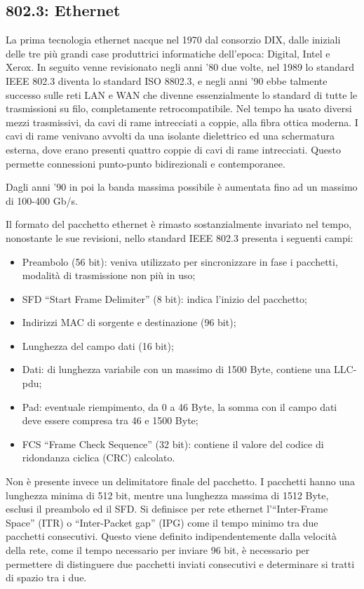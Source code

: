\documentclass{article}
\numberwithin{equation}{subsection}
\begin{document}

\subsection{802.3: Ethernet}
\label{sec:ieee_802.3}

La prima tecnologia ethernet nacque nel 1970 dal consorzio DIX, dalle iniziali delle tre più grandi case produttrici informatiche dell'epoca: Digital, Intel e Xerox. 
In seguito venne revisionato negli anni '80 due volte, nel 1989 lo standard IEEE 802.3 diventa lo standard ISO 8802.3, e negli anni '90 ebbe talmente successo sulle reti LAN e WAN che divenne essenzialmente lo 
standard di tutte le trasmissioni su filo, completamente retrocompatibile. 
Nel tempo ha usato diversi mezzi trasmissivi, da cavi di rame intrecciati a coppie, alla fibra ottica moderna. I cavi di rame venivano avvolti da una isolante dielettrico ed una schermatura esterna, dove erano 
presenti quattro coppie di cavi di rame intrecciati. Questo permette connessioni punto-punto bidirezionali e contemporanee. 

Dagli anni '90 in poi la banda massima possibile è aumentata fino ad un massimo di 100-400 Gb/s. 



Il formato del pacchetto ethernet è rimasto sostanzialmente invariato nel tempo, nonostante le sue revisioni, nello standard IEEE 802.3 presenta i seguenti campi:
\begin{itemize}
  \item Preambolo (56 bit): veniva utilizzato per sincronizzare in fase i pacchetti, modalità di trasmissione non più in uso;
  \item SFD ``Start Frame Delimiter'' (8 bit): indica l'inizio del pacchetto;
  \item Indirizzi MAC di sorgente e destinazione (96 bit);
  \item Lunghezza del campo dati (16 bit);
  \item Dati: di lunghezza variabile con un massimo di 1500 Byte, contiene una LLC-pdu;
  \item Pad: eventuale riempimento, da 0 a 46 Byte, la somma con il campo dati deve essere compresa tra 46 e 1500 Byte;
  \item FCS ``Frame Check Sequence'' (32 bit): contiene il valore del codice di ridondanza ciclica (CRC) calcolato. 
\end{itemize}

Non è presente invece un delimitatore finale del pacchetto. I pacchetti hanno una lunghezza minima di 512 bit, mentre una lunghezza massima di 1512 Byte, esclusi il preambolo ed il SFD. Si definisce per rete ethernet 
l'``Inter-Frame Space'' (ITR) o ``Inter-Packet gap'' (IPG) come il tempo minimo tra due pacchetti consecutivi. Questo viene definito indipendentemente dalla velocità della rete, come il tempo necessario per 
inviare 96 bit, è necessario per permettere di distinguere due pacchetti inviati consecutivi e determinare si tratti di spazio tra i due. 
\end{document}
